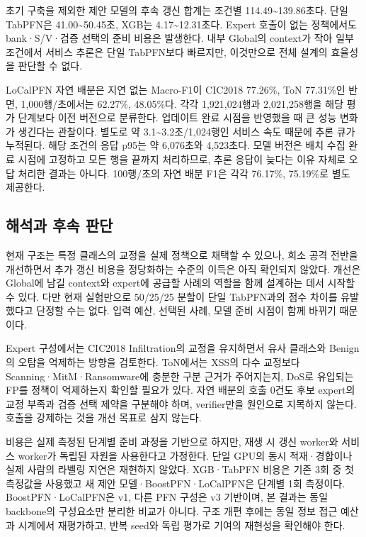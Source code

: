 초기 구축을 제외한 제안 모델의 후속 갱신 합계는 조건별 114.49\textasciitilde{}139.86초다. 단일 TabPFN은 41.00\textasciitilde{}50.45초, XGB는 4.17\textasciitilde{}12.31초다. Expert 호출이 없는 정책에서도 bank·S/\allowbreak{}V·검증 선택의 준비 비용은 발생한다. 내부 Global의 context가 작아 일부 조건에서 서비스 추론은 단일 TabPFN보다 빠르지만, 이것만으로 전체 설계의 효율성을 판단할 수 없다.

LoCalPFN 자연 배분은 지연 없는 Macro-F1이 CIC2018 77.26\%, ToN 77.31\%인 반면, 1,000행/\allowbreak{}초에서는 62.27\%, 48.05\%다. 각각 1,921,024행과 2,021,258행을 해당 평가 단계보다 이전 버전으로 분류한다. 업데이트 완료 시점을 반영했을 때 큰 성능 변화가 생긴다는 관찰이다. 별도로 약 3.1\textasciitilde{}3.2초/\allowbreak{}1,024행인 서비스 속도 때문에 추론 큐가 누적된다. 해당 조건의 응답 p95는 약 6,076초와 4,523초다. 모델 버전은 배치 수집 완료 시점에 고정하고 모든 행을 끝까지 처리하므로, 추론 응답이 늦다는 이유 자체로 오답 처리한 결과는 아니다. 100행/\allowbreak{}초의 자연 배분 F1은 각각 76.17\%, 75.19\%로 별도 제공한다.

\subsection{해석과 후속 판단}
현재 구조는 특정 클래스의 교정을 실제 정책으로 채택할 수 있으나, 희소 공격 전반을 개선하면서 추가 갱신 비용을 정당화하는 수준의 이득은 아직 확인되지 않았다. 개선은 Global에 남길 context와 expert에 공급할 사례의 역할을 함께 설계하는 데서 시작할 수 있다. 다만 현재 실험만으로 50/\allowbreak{}25/\allowbreak{}25 분할이 단일 TabPFN과의 점수 차이를 유발했다고 단정할 수는 없다. 입력 예산, 선택된 사례, 모델 준비 시점이 함께 바뀌기 때문이다.

Expert 구성에서는 CIC2018 Infiltration의 교정을 유지하면서 유사 클래스와 Benign의 오탐을 억제하는 방향을 검토한다. ToN에서는 XSS의 다수 교정보다 Scanning·MitM·Ransomware에 충분한 구분 근거가 주어지는지, DoS로 유입되는 FP를 정책이 억제하는지 확인할 필요가 있다. 자연 배분의 호출 0건도 후보 expert의 교정 부족과 검증 선택 제약을 구분해야 하며, verifier만을 원인으로 지목하지 않는다. 호출을 강제하는 것을 개선 목표로 삼지 않는다.

비용은 실제 측정된 단계별 준비 과정을 기반으로 하지만, 재생 시 갱신 worker와 서비스 worker가 독립된 자원을 사용한다고 가정한다. 단일 GPU의 동시 적재·경합이나 실제 사람의 라벨링 지연은 재현하지 않았다. XGB·TabPFN 비용은 기존 3회 중 첫 측정값을 사용했고 새 제안 모델·BoostPFN·LoCalPFN은 단계별 1회 측정이다. BoostPFN·LoCalPFN은 v1, 다른 PFN 구성은 v3 기반이며, 본 결과는 동일 backbone의 구성요소만 분리한 비교가 아니다. 구조 개편 후에는 동일 정보 접근 예산과 시계에서 재평가하고, 반복 seed와 독립 평가로 기여의 재현성을 확인해야 한다.

